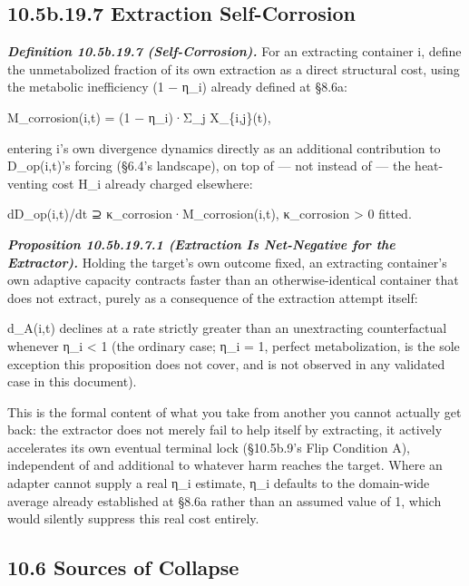 \documentclass[
]{article}
\begin{document}
\hypertarget{b.19.7-extraction-self-corrosion}{%
\subsection{10.5b.19.7 Extraction
Self-Corrosion}\label{b.19.7-extraction-self-corrosion}}

\emph{\textbf{Definition 10.5b.19.7 (Self-Corrosion).}} For an
extracting container i, define the unmetabolized fraction of its own
extraction as a direct structural cost, using the metabolic inefficiency
(1 − η\_i) already defined at §8.6a:

M\_corrosion(i,t) = (1 − η\_i)·Σ\_j X\_\{i,j\}(t),

entering i's own divergence dynamics directly as an additional
contribution to D\_op(i,t)'s forcing (§6.4's landscape), on top of ---
not instead of --- the heat-venting cost H\_i already charged elsewhere:

dD\_op(i,t)/dt ⊇ κ\_corrosion·M\_corrosion(i,t), κ\_corrosion
\textgreater{} 0 fitted.

\emph{\textbf{Proposition 10.5b.19.7.1 (Extraction Is Net-Negative for
the Extractor).}} Holding the target's own outcome fixed, an extracting
container's own adaptive capacity contracts faster than an
otherwise-identical container that does not extract, purely as a
consequence of the extraction attempt itself:

d\_A(i,t) declines at a rate strictly greater than an unextracting
counterfactual whenever η\_i \textless{} 1 (the ordinary case; η\_i = 1,
perfect metabolization, is the sole exception this proposition does not
cover, and is not observed in any validated case in this document).

This is the formal content of what you take from another you cannot
actually get back: the extractor does not merely fail to help itself by
extracting, it actively accelerates its own eventual terminal lock
(§10.5b.9's Flip Condition A), independent of and additional to whatever
harm reaches the target. Where an adapter cannot supply a real η\_i
estimate, η\_i defaults to the domain-wide average already established
at §8.6a rather than an assumed value of 1, which would silently
suppress this real cost entirely.

\hypertarget{sources-of-collapse}{%
\subsection{10.6 Sources of Collapse}\label{sources-of-collapse}}
\end{document}
